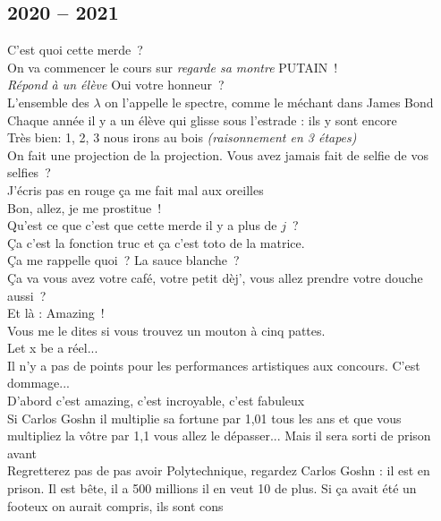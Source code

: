 \documentclass[french, a4paper, openany]{book}
\begin{document}
	\subsection*{2020 -- 2021}
		\noindent \og C'est quoi cette merde~? \fg \\
		\og On va commencer le cours sur \emph{regarde sa montre} PUTAIN~! \fg \\
		\emph{Répond à un élève} \og Oui votre honneur~? \fg \\
		\og L'ensemble des $\lambda$ on l'appelle le spectre, comme le méchant dans James Bond \fg \\
		\og Chaque année il y a un élève qui glisse sous l'estrade : ils y sont encore \fg \\
		\og Très bien: 1, 2, 3 nous irons au bois \fg \emph{(raisonnement en 3 étapes)} \\
		\og On fait une projection de la projection. Vous avez jamais fait de selfie de vos selfies~? \fg \\
		\og J'écris pas en rouge ça me fait mal aux oreilles \fg \\
		\og Bon, allez, je me prostitue~! \fg \\
		\og Qu'est ce que c'est que cette merde il y a plus de $j$~? \fg \\
		\og Ça c'est la fonction truc et ça c'est toto de la matrice. \fg \\
		\og Ça me rappelle quoi~? La sauce blanche~? \fg \\
		\og Ça va vous avez votre café, votre petit dèj', vous allez prendre votre douche aussi~? \fg \\
		\og Et là : Amazing~! \fg \\
		\og Vous me le dites si vous trouvez un mouton à cinq pattes. \fg \\
		\og Let x be a réel... \fg \\
		\og Il n'y a pas de points pour les performances artistiques aux concours. C'est dommage... \fg \\
		\og D'abord c'est amazing, c'est incroyable, c'est fabuleux \fg \\
		\og Si Carlos Goshn il multiplie sa fortune par 1,01 tous les ans et que vous multipliez la vôtre par 1,1 vous allez le dépasser... Mais il sera sorti de prison avant \fg \\
		\og Regretterez pas de pas avoir Polytechnique, regardez Carlos Goshn : il est en prison. Il est bête, il a 500 millions il en veut 10 de plus. Si ça avait été un footeux on aurait compris, ils sont cons \fg \\
\end{document}
